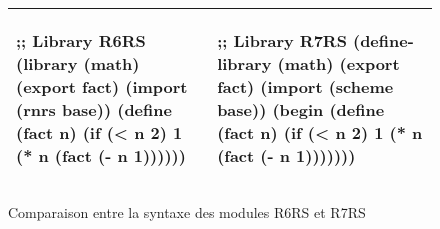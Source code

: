 
\begin{center}
  \begin{figure}[h]
  \begin{tabular}{|l|l|}
    \hline
    \begin{mplisting}{0.5}
;; Library R6RS
(library (math)
  (export fact)
  (import (rnrs base))
  (define (fact n)
    (if (< n 2)
      1
      (* n (fact (- n 1))))))
\end{mplisting} &
    \begin{mplisting}{0.5}
;; Library R7RS
(define-library (math)
  (export fact)
  (import (scheme base))
  (begin
    (define (fact n)
      (if (< n 2)
        1
        (* n (fact (- n 1)))))))
\end{mplisting}\\\hline
  \end{tabular}
    \caption{Comparaison entre la syntaxe des modules R6RS et R7RS}
  \label{fig:r6rs_r7rs_math_mdoule}
\end{figure}
\end{center}







